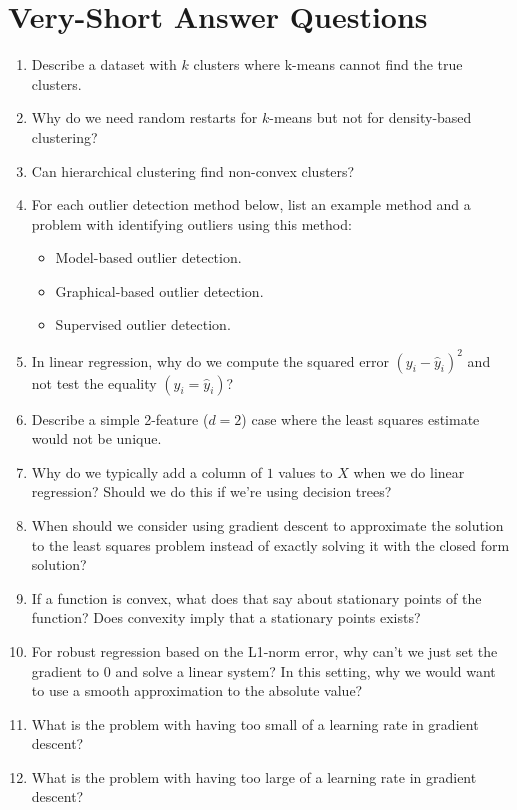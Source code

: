 \documentclass{article}
\begin{document}
\section{Very-Short Answer Questions}



\begin{enumerate}
\item Describe a dataset with $k$ clusters where k-means cannot find the true clusters.
\item Why do we need random restarts for $k$-means but not for density-based clustering?
\item Can hierarchical clustering find non-convex clusters?
\item For each outlier detection method below, list an example method and a problem with identifying outliers using this method:
\begin{itemize}
\item Model-based outlier detection.
\item Graphical-based outlier detection.
\item Supervised outlier detection.
\end{itemize}
\item In linear regression, why do we compute the squared error $(y_i -  \hat{y}_i)^2$ and not test the equality $(y_i = \hat{y}_i)$?
\item Describe a simple 2-feature ($d=2$) case where the least squares estimate would not be unique.
\item Why do we typically add a column of $1$ values to $X$ when we do linear regression? Should we do this if we're using decision trees?
\item When should we consider using gradient descent to approximate the solution to the least squares problem instead of exactly solving it with the closed form solution? 
\item If a function is convex, what does that say about stationary points of the function? Does convexity imply that a stationary points exists?
\item For robust regression based on the L1-norm error, why can't we just set the gradient to 0 and solve a linear system? In this setting, why we would want to use a smooth approximation to the absolute value? 
\item What is the problem with having too small of a learning rate in gradient descent?
\item What is the problem with having too large of a learning rate in gradient descent?
\end{enumerate}
\end{document}
